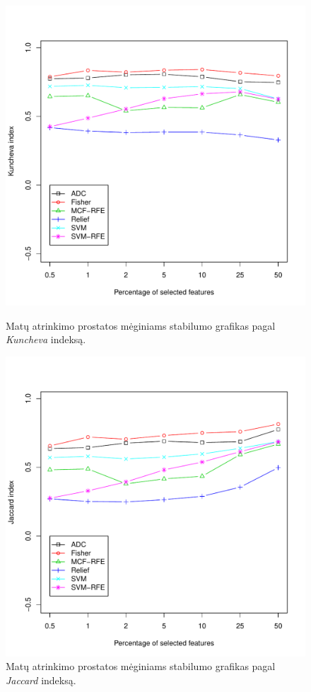 \begin{figure}[htb]
\begin{minipage}[b]{0.5\linewidth}
\centering
\includegraphics[width=\textwidth]{../bachelor/images/prostate_robustness_kuncheva.pdf}
\caption{Matų atrinkimo prostatos mėginiams stabilumo grafikas pagal \textit{Kuncheva} indeksą.}
\label{fig:robk_prostate}
\end{minipage}
\hspace{0.1cm}
\begin{minipage}[b]{0.5\linewidth}
\centering
\includegraphics[width=\textwidth]{../bachelor/images/prostate_robustness_jaccard.pdf}
\caption{Matų atrinkimo prostatos mėginiams stabilumo grafikas pagal \textit{Jaccard} indeksą.}
\label{fig:robj_prostate}
\end{minipage}
\end{figure}
